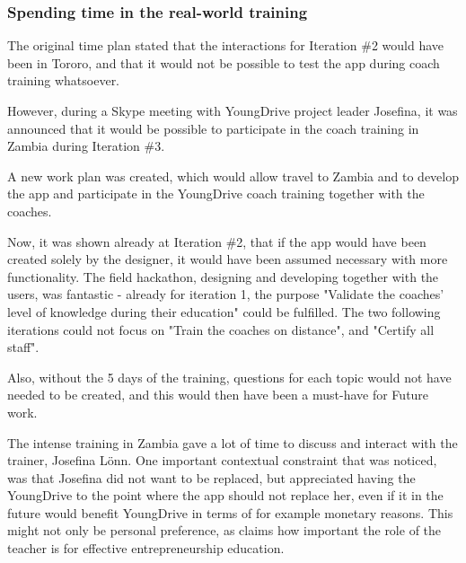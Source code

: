   \subsubsection{Spending time in the real-world training}
  The original time plan stated that the interactions for Iteration \#2 would have been in Tororo, and that it would not be possible to test the app during coach training whatsoever.


  However, during a Skype meeting with YoungDrive project leader Josefina, it was announced that it would be possible to participate in the coach training in Zambia during Iteration \#3.

  A new work plan was created, which would allow travel to Zambia and to develop the app and participate in the YoungDrive coach training together with the coaches.

  Now, it was shown already at Iteration \#2, that if the app would have been created solely by the designer, it would have been assumed necessary with more functionality. The field hackathon, designing and developing together with the users, was fantastic - already for iteration 1, the purpose "Validate the coaches' level of knowledge during their education" could be fulfilled. The two following iterations could not focus on "Train the coaches on distance", and "Certify all staff".

  Also, without the 5 days of the training, questions for each topic would not have needed to be created, and this would then have been a must-have for Future work. %

  The intense training in Zambia gave a lot of time to discuss and interact with the trainer, Josefina Lönn. One important contextual constraint that was noticed, was that Josefina did not want to be replaced, but appreciated having the YoungDrive to the point where the app should not replace her, even if it in the future would benefit YoungDrive in terms of for example monetary reasons. This might not only be personal preference, as \cite{ruskovaara} claims how important the role of the teacher is for effective entrepreneurship education.

